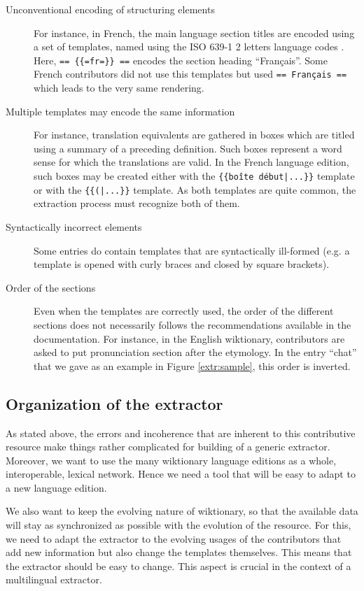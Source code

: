 \documentclass[10pt, a4paper]{article}
\begin{document}
\begin{description}
\item [Unconventional encoding of structuring elements] For instance, in French, the main language section titles are encoded using a set of templates, named using the ISO 639-1 2 letters language codes \cite{ISO639-1:2002}. Here, \texttt{== \{\{=fr=\}\} ==} encodes the section heading ``Français''. Some French contributors did not use this templates but used \texttt{== Français ==} which leads to the very same rendering.
\item [Multiple templates may encode the same information] For instance, translation equivalents are gathered in boxes which are titled using a summary of a preceding definition. Such boxes represent a word sense for which the translations are valid. In the French language edition, such boxes may be created either with the \texttt{\{\{boîte début|...\}\}} template or with the \texttt{\{\{(|...\}\}} template. As both templates are quite common, the extraction process must recognize both of them.
\item [Syntactically incorrect elements] Some entries do contain templates that are syntactically ill-formed (e.g. a template is opened with curly braces and closed by square brackets).
\item [Order of the sections] Even when the templates are correctly used, the order of the different sections does not necessarily follows the recommendations available in the documentation. For instance, in the English wiktionary, contributors are asked to put pronunciation section after the etymology. In the entry ``chat'' that we gave as an example in Figure \ref{extr:sample}, this order is inverted. 
\end{description}

\subsection{Organization of the extractor}

As stated above, the errors and incoherence that are inherent to this contributive resource make things rather complicated for building of a generic extractor. Moreover, we want to use the many wiktionary language editions as a whole, interoperable, lexical network. Hence we need a tool that will be easy to adapt to a new language edition. 

We also want to keep the evolving nature of wiktionary, so that the available data will stay as synchronized as possible with the evolution of the resource. For this, we need to adapt the extractor to the evolving usages of the contributors that add new information but also change the templates themselves. This means that the extractor should be easy to change. This aspect is crucial in the context of a multilingual extractor.
\end{document}
